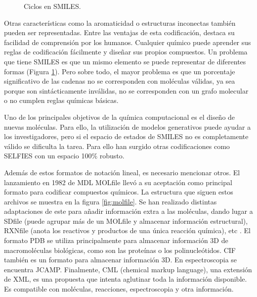 \begin{figure}[H]
\centering
    \caption{Ciclos en SMILES. \cite{weininger1988smiles}}
    \label{fig:ciclos-smiles}
\end{figure}

Otras características como la aromaticidad o estructuras inconectas también pueden ser representadas. Entre las ventajas de esta codificación, destaca su facilidad de comprensión por los humanos. Cualquier químico puede aprender sus reglas de codificación fácilmente y diseñar sus propios compuestos. Un problema que tiene SMILES es que un mismo elemento se puede representar de diferentes formas (Figura \ref{fig:ciclos-smiles}). Pero sobre todo, el mayor problema es que un porcentaje significativo de las cadenas no se corresponden con moléculas válidas, ya sea porque son sintácticamente inválidas, no se corresponden con un grafo molecular o no cumplen reglas químicas básicas. \cite{weininger1988smiles}

Uno de los principales objetivos de la química computacional es el diseño de nuevas moléculas. Para ello, la utilización de modelos generativos puede ayudar a los investigadores, pero si el espacio de estados de SMILES no es completamente válido se dificulta la tarea. Para ello han surgido otras codificaciones como SELFIES con un espacio 100\% robusto. \cite{Krenn_2020}

Además de estos formatos de notación lineal, es necesario mencionar otros. El lanzamiento en 1982 de MDL MOLfile llevó a su aceptación como principal formato para codificar compuestos químicos. La estructura que siguen estos archivos se muestra en la figura \ref{fig:molfile}. Se han realizado distintas adaptaciones de este para añadir información extra a las moléculas, dando lugar a SDfile (puede agrupar más de un MOLfile y almacenar información estructural), RXNfile (anota los reactivos y productos de una única reacción química), etc \cite{doi:10.1021/ci00007a012}. El formato PDB se utiliza principalmente para almacenar información 3D de macromoléculas biológicas, como son las proteínas o los polinucleótidos. CIF también es un formato para almacenar información 3D. En espectroscopia se encuentra JCAMP. Finalmente, CML (chemical markup language), una extensión de XML, es una propuesta que intenta aglutinar toda la información disponible. Es compatible con moléculas, reacciones, espectroscopia y otra información. \cite{doi:10.1021/ci600234z}


